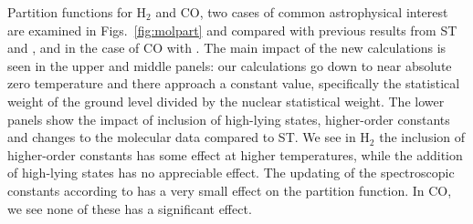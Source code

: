 \documentclass[traditabstract]{aa} %
\begin{document}
Partition functions for H$_2$ and CO, two cases of common astrophysical interest are examined in Figs.~\ref{fig:molpart} and compared with previous results from ST and \cite{1987A&A...182..348I}, and in the case of CO with \cite{2000JMoSt.517..407G}.  The main impact of the new calculations is seen in the upper and middle panels:  our calculations go down to near absolute zero temperature and there approach a constant value, specifically the statistical weight of the ground level divided by the nuclear statistical weight.  The lower panels show the impact of inclusion of high-lying states, higher-order constants and changes to the molecular data compared to ST.  We see in H$_2$ the inclusion of higher-order constants has some effect at higher temperatures, while the addition of high-lying states has no appreciable effect.  The updating of the spectroscopic constants according to \cite{2007JPCRD..36..389I} has a very small effect on the partition function.  In CO, we see none of these has a significant effect.
\end{document}
